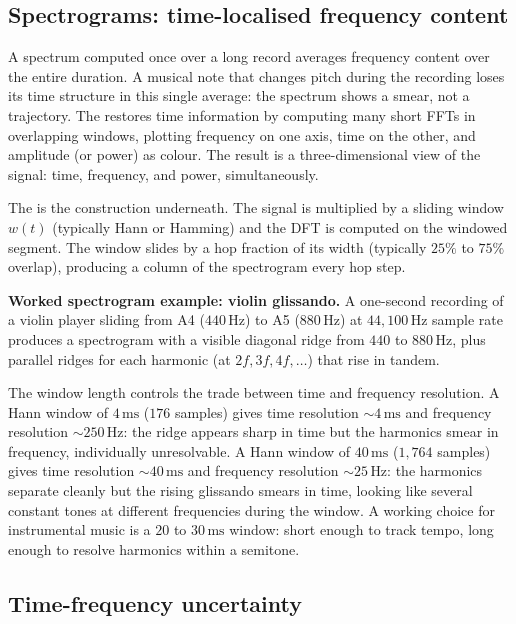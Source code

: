 \subsection{Spectrograms: time-localised frequency content}

A spectrum computed once over a long record averages frequency
content over the entire duration. A musical note that changes pitch
during the recording loses its time structure in this single
average: the spectrum shows a smear, not a trajectory. The
 restores time information by computing many
short FFTs in overlapping windows, plotting frequency on one axis,
time on the other, and amplitude (or power) as colour. The result
is a three-dimensional view of the signal: time, frequency, and
power, simultaneously.

The  is the
construction underneath. The signal is multiplied by a sliding
window $w(t)$ (typically Hann or Hamming) and the DFT is computed
on the windowed segment. The window slides by a hop fraction of
its width (typically $25\%$ to $75\%$ overlap), producing a column
of the spectrogram every hop step.

\textbf{Worked spectrogram example: violin glissando.} A one-second
recording of a violin player sliding from A4 ($440 \,\si{\hertz}$)
to A5 ($880 \,\si{\hertz}$) at $44{,}100 \,\si{\hertz}$ sample
rate produces a spectrogram with a visible diagonal ridge from
$440$ to $880 \,\si{\hertz}$, plus parallel ridges for each
harmonic (at $2f, 3f, 4f, \ldots$) that rise in tandem.

The window length controls the trade between time and frequency
resolution. A Hann window of $4 \,\si{\milli\second}$ ($176$
samples) gives time resolution $\sim 4 \,\si{\milli\second}$ and
frequency resolution $\sim 250 \,\si{\hertz}$: the ridge appears
sharp in time but the harmonics smear in frequency, individually
unresolvable. A Hann window of $40 \,\si{\milli\second}$ ($1{,}764$
samples) gives time resolution $\sim 40 \,\si{\milli\second}$ and
frequency resolution $\sim 25 \,\si{\hertz}$: the harmonics
separate cleanly but the rising glissando smears in time, looking
like several constant tones at different frequencies during the
window. A working choice for instrumental music is a $20$ to
$30 \,\si{\milli\second}$ window: short enough to track tempo,
long enough to resolve harmonics within a semitone.

\subsection{Time-frequency uncertainty}

